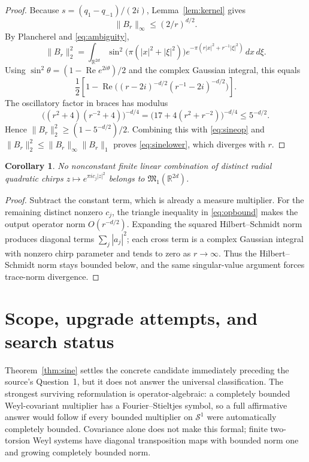 \documentclass[11pt]{article}
\newtheorem{corollary}[theorem]{Corollary}
\newcommand{\R}{\mathbb R}
\newcommand{\Schat}{\mathcal S}
\newcommand{\Mm}{\mathfrak M}
\begin{document}
\begin{proof}
Because $s=(q_1-q_{-1})/(2i)$, Lemma~\ref{lem:kernel} gives
\begin{equation}\label{eq:sineop}
                    \|B_r\|_\infty\le(2/r)^{d/2}.
\end{equation}
By Plancherel and \eqref{eq:ambiguity},
\[
 \|B_r\|_2^2
 =\int_{\R^{2d}}\sin^2\!\bigl(\pi(|x|^2+|\xi|^2)\bigr)
   e^{-\pi(r|x|^2+r^{-1}|\xi|^2)}\,dx\,d\xi.
\]
Using $\sin^2\theta=(1-\operatorname{Re}e^{2i\theta})/2$ and the complex
Gaussian integral, this equals
\begin{equation}\label{eq:exacths}
 \frac12\left[1-\operatorname{Re}\bigl(
 (r-2i)^{-d/2}(r^{-1}-2i)^{-d/2}\bigr)\right].
\end{equation}
The oscillatory factor in braces has modulus
\[
 \bigl((r^2+4)(r^{-2}+4)\bigr)^{-d/4}
 =\bigl(17+4(r^2+r^{-2})\bigr)^{-d/4}
 \le5^{-d/2}.
\]
Hence $\|B_r\|_2^2\ge(1-5^{-d/2})/2$.  Combining this with
\eqref{eq:sineop} and
$\|B_r\|_2^2\le\|B_r\|_\infty\|B_r\|_1$ proves
\eqref{eq:sinelower}, which diverges with $r$.
\end{proof}

\begin{corollary}\label{cor:finite}
No nonconstant finite linear combination of distinct radial quadratic chirps
$z\mapsto e^{\pi ic_j|z|^2}$ belongs to $\Mm_1(\R^{2d})$.
\end{corollary}

\begin{proof}
Subtract the constant term, which is already a measure multiplier.  For the
remaining distinct nonzero $c_j$, the triangle inequality in
\eqref{eq:opbound} makes the output operator norm $O(r^{-d/2})$.  Expanding
the squared Hilbert--Schmidt norm produces diagonal terms $\sum_j|a_j|^2$;
each cross term is a complex Gaussian integral with nonzero chirp parameter
and tends to zero as $r\to\infty$.  Thus the Hilbert--Schmidt norm stays
bounded below, and the same singular-value argument forces trace-norm
divergence.
\end{proof}

\section{Scope, upgrade attempts, and search status}

Theorem~\ref{thm:sine} settles the concrete candidate immediately preceding
the source's Question~1, but it does not answer the universal classification.
The strongest surviving reformulation is operator-algebraic: a completely
bounded Weyl-covariant multiplier has a Fourier--Stieltjes symbol, so a full
affirmative answer would follow if every bounded multiplier on $\Schat^1$
were automatically completely bounded.  Covariance alone does not make this
formal; finite two-torsion Weyl systems have diagonal transposition maps with
bounded norm one and growing completely bounded norm.
\end{document}
